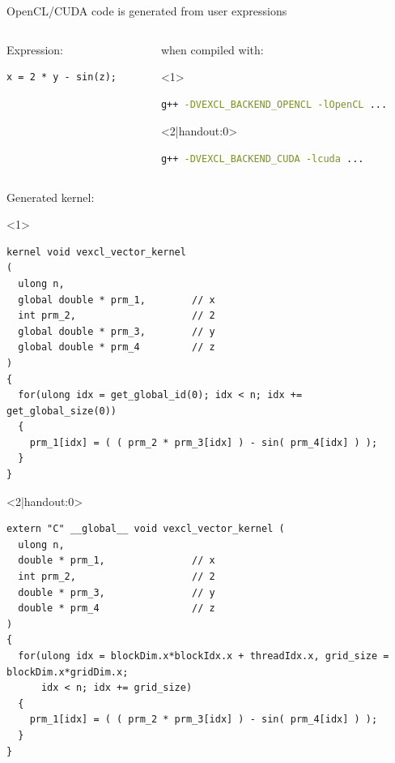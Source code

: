 \documentclass[@BEAMER_OPTIONS@]{beamer}
\begin{document}
\begin{frame}[fragile]{OpenCL/CUDA code is generated from user expressions}
    \begin{columns}
        \begin{column}{0.38\textwidth}
            \begin{exampleblock}{Expression:}
                \begin{lstlisting}[numbers=none]
x = 2 * y - sin(z);
                \end{lstlisting}
            \end{exampleblock}
        \end{column}
        \begin{column}{0.55\textwidth}
            \begin{exampleblock}{when compiled with:}
                \begin{onlyenv}<1>
                    \begin{lstlisting}[language=bash,numbers=none]
g++ -DVEXCL_BACKEND_OPENCL -lOpenCL ...
                    \end{lstlisting}
                \end{onlyenv}
                \begin{onlyenv}<2|handout:0>
                    \begin{lstlisting}[language=bash,numbers=none]
g++ -DVEXCL_BACKEND_CUDA -lcuda ...
                    \end{lstlisting}
                \end{onlyenv}
            \end{exampleblock}
        \end{column}
    \end{columns}
    \begin{exampleblock}{Generated kernel:}
        \begin{onlyenv}<1>
            \begin{lstlisting}
kernel void vexcl_vector_kernel
(
  ulong n,
  global double * prm_1,        // x
  int prm_2,                    // 2
  global double * prm_3,        // y
  global double * prm_4         // z
)
{
  for(ulong idx = get_global_id(0); idx < n; idx += get_global_size(0))
  {
    prm_1[idx] = ( ( prm_2 * prm_3[idx] ) - sin( prm_4[idx] ) );
  }
}
            \end{lstlisting}
        \end{onlyenv}
        \begin{onlyenv}<2|handout:0>
            \begin{lstlisting}
extern "C" __global__ void vexcl_vector_kernel (
  ulong n,
  double * prm_1,               // x
  int prm_2,                    // 2
  double * prm_3,               // y
  double * prm_4                // z
)
{
  for(ulong idx = blockDim.x*blockIdx.x + threadIdx.x, grid_size = blockDim.x*gridDim.x;
      idx < n; idx += grid_size)
  {
    prm_1[idx] = ( ( prm_2 * prm_3[idx] ) - sin( prm_4[idx] ) );
  }
}
            \end{lstlisting}
        \end{onlyenv}
    \end{exampleblock}
\end{frame}
\end{document}
